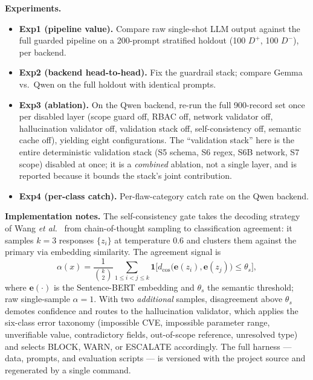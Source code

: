 \documentclass[conference]{IEEEtran}
\begin{document}
\textbf{Experiments.}
\begin{itemize}
\item{\textbf{Exp1 (pipeline value).}} Compare raw single-shot LLM output against the full guarded pipeline on a 200-prompt stratified holdout (100 $D^+$, 100 $D^-$), per backend.
\item{\textbf{Exp2 (backend head-to-head).}} Fix the guardrail stack; compare Gemma vs.\ Qwen on the full holdout with identical prompts.
\item{\textbf{Exp3 (ablation).}} On the Qwen backend, re-run the full 900-record set once per disabled layer (scope guard off, RBAC off, network validator off, hallucination validator off, validation stack off, self-consistency off, semantic cache off), yielding eight configurations. The ``validation stack'' here is the entire deterministic validation stack (S5 schema, S6 regex, S6B network, S7 scope) disabled at once; it is a \emph{combined} ablation, not a single layer, and is reported because it bounds the stack's joint contribution.
\item{\textbf{Exp4 (per-class catch).}} Per-flaw-category catch rate on the Qwen backend.
\end{itemize}

\textbf{Implementation notes.} The self-consistency gate takes the decoding strategy of Wang \emph{et al.}~\cite{wang2023selfconsistency} from chain-of-thought sampling to classification agreement: it samples $k{=}3$ responses $\{z_i\}$ at temperature 0.6 and clusters them against the primary via embedding similarity. The agreement signal is
\begin{equation}
\alpha(x) = \frac{1}{\binom{k}{2}}\sum_{1\le i<j\le k}\mathbf{1}\!\big[d_{\mathrm{cos}}\big(\mathbf{e}(z_i),\mathbf{e}(z_j)\big)\le\theta_s\big],
\label{eq:agreement}
\end{equation}
where $\mathbf{e}(\cdot)$ is the Sentence-BERT embedding and $\theta_s$ the semantic threshold; raw single-sample $\alpha{=}1$. With two \emph{additional} samples, disagreement above $\theta_s$ demotes confidence and routes to the hallucination validator, which applies the six-class error taxonomy (impossible CVE, impossible parameter range, unverifiable value, contradictory fields, out-of-scope reference, unresolved type) and selects BLOCK, WARN, or ESCALATE accordingly. The full harness --- data, prompts, and evaluation scripts --- is versioned with the project source and regenerated by a single command.
\end{document}
